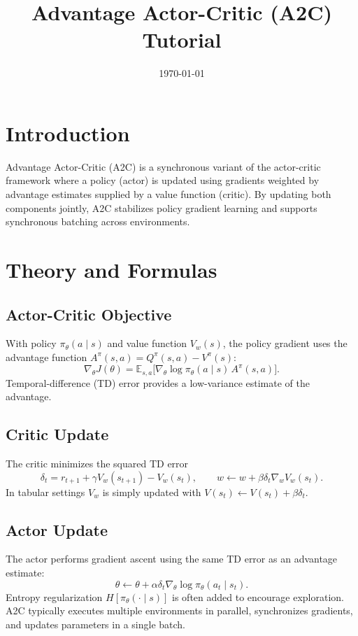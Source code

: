 ﻿\documentclass[12pt]{article}
\title{Advantage Actor-Critic (A2C) Tutorial}
\author{}
\date{\today}
\begin{document}
\maketitle

\section{Introduction}
Advantage Actor-Critic (A2C) is a synchronous variant of the actor-critic framework where a policy (actor) is updated using gradients weighted by advantage estimates supplied by a value function (critic). By updating both components jointly, A2C stabilizes policy gradient learning and supports synchronous batching across environments.

\section{Theory and Formulas}
\subsection{Actor-Critic Objective}
With policy \(\pi_\theta(a\mid s)\) and value function \(V_w(s)\), the policy gradient uses the advantage function \(A^{\pi}(s,a) = Q^{\pi}(s,a) - V^{\pi}(s)\):
\begin{equation}
\nabla_\theta J(\theta) = \mathbb{E}_{s,a}\big[ \nabla_\theta \log \pi_\theta(a\mid s)\, A^{\pi}(s,a) \big].
\end{equation}
Temporal-difference (TD) error provides a low-variance estimate of the advantage.

\subsection{Critic Update}
The critic minimizes the squared TD error
\begin{equation}
\delta_t = r_{t+1} + \gamma V_w(s_{t+1}) - V_w(s_t), \qquad w \leftarrow w + \beta \delta_t \nabla_w V_w(s_t).
\end{equation}
In tabular settings \(V_w\) is simply updated with \(V(s_t) \leftarrow V(s_t) + \beta \delta_t\).

\subsection{Actor Update}
The actor performs gradient ascent using the same TD error as an advantage estimate:
\begin{equation}
\theta \leftarrow \theta + \alpha \delta_t \nabla_\theta \log \pi_\theta(a_t\mid s_t).
\end{equation}
Entropy regularization \(H[\pi_\theta(\cdot\mid s)]\) is often added to encourage exploration. A2C typically executes multiple environments in parallel, synchronizes gradients, and updates parameters in a single batch.
\end{document}
